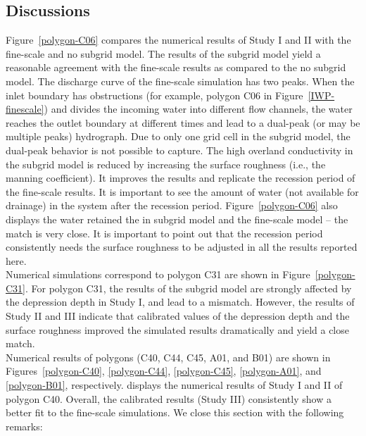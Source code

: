 \documentclass[review,11pt]{elsarticle}
\begin{document}
\subsection{Discussions}

Figure~\ref{polygon-C06} compares the numerical results of Study I and II with the fine-scale and no subgrid model. The results of the subgrid model yield a reasonable agreement with the fine-scale results as compared to the no subgrid model. The discharge curve of the fine-scale simulation has two peaks. When the inlet boundary has obstructions (for example, polygon C06 in Figure~\ref{IWP-finescale}) and divides the incoming water into different flow channels, the water reaches the outlet boundary at different times and lead to a dual-peak (or may be multiple peaks) hydrograph.  Due to only one grid cell in the subgrid model, the dual-peak behavior is not possible to capture. The high overland conductivity in the subgrid model is reduced by increasing the surface roughness (i.e., the manning coefficient). It improves the results and replicate the recession period of the fine-scale results. It is important to see the amount of water (not available for drainage) in the system after the recession period. Figure~\ref{polygon-C06} also displays the water retained the in subgrid model and the fine-scale model -- the match is very close. It is important to point out that the recession period consistently needs the surface roughness to be adjusted in all the results reported here. \\
Numerical simulations correspond to polygon C31 are shown in Figure~\ref{polygon-C31}. For polygon C31, the results of the subgrid model are strongly affected by the depression depth in Study I, and lead to a mismatch. However, the results of Study II and III indicate that calibrated values of the depression depth and the surface roughness improved the simulated results dramatically and yield a close match. \\ %
Numerical results of polygons (C40, C44, C45, A01, and B01) are shown in Figures~\ref{polygon-C40}, \ref{polygon-C44}, \ref{polygon-C45}, \ref{polygon-A01}, and \ref{polygon-B01}, respectively. displays the numerical results of Study I and II of polygon C40. Overall, the calibrated results (Study III) consistently show a better fit to the fine-scale simulations. We close this section with the following remarks:
\end{document}
